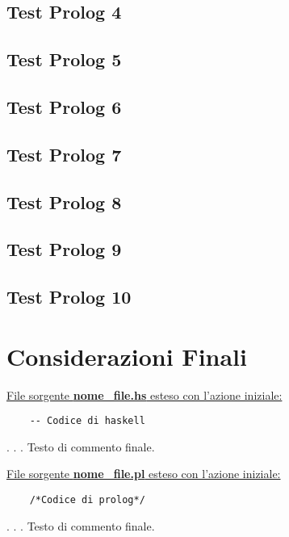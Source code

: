 \documentclass{article}
\begin{document}
\subsection*{Test Prolog 4}
\subsection*{Test Prolog 5}
\subsection*{Test Prolog 6}
\subsection*{Test Prolog 7}
\subsection*{Test Prolog 8}
\subsection*{Test Prolog 9}
\subsection*{Test Prolog 10}
\newpage

\section{Considerazioni Finali}
\raggedright
\underline{File sorgente \textbf{nome\_file.hs} esteso con l'azione iniziale:}
\lstset{language=Haskell}
\begin{lstlisting}
	-- Codice di haskell
\end{lstlisting}
.
\newline
.
\newline
.
\newline
Testo di commento finale.
\newpage
\raggedright
\underline{File sorgente \textbf{nome\_file.pl} esteso con l'azione iniziale:}
\lstset{language=Prolog}
\begin{lstlisting}
	/*Codice di prolog*/
\end{lstlisting}
.
\newline
.
\newline
.
\newline
Testo di commento finale.
\end{document}
